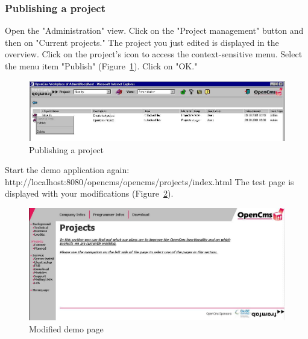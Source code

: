 \subsubsection{Publishing a project}

Open the "Administration" view. Click on the "Project management"
button and then on "Current projects." The project you just edited
is displayed in the overview. Click on the project's icon to
access the context-sensitive menu. Select the menu item "Publish"
(Figure~\ref{publishproject}). Click on "OK."

\begin{figure}[hbt]
\begin{center}
\includegraphics[width=\sgw]
                   {pics/usermanual/publishProject01}
\caption[Publishing a project]
           {Publishing a project}
\label{publishproject}
\end{center}
\end{figure}

Start the demo application again:\\
http://localhost:8080/opencms/opencms/projects/index.html The test page
is displayed with your modifications (Figure~\ref{demopage02}).

\begin{figure}[hbt]
\begin{center}
\includegraphics[width=\sgw]
                   {pics/usermanual/demoPage02}
\caption[Modified demo page]
           {Modified demo page}
\label{demopage02}
\end{center}
\end{figure}



